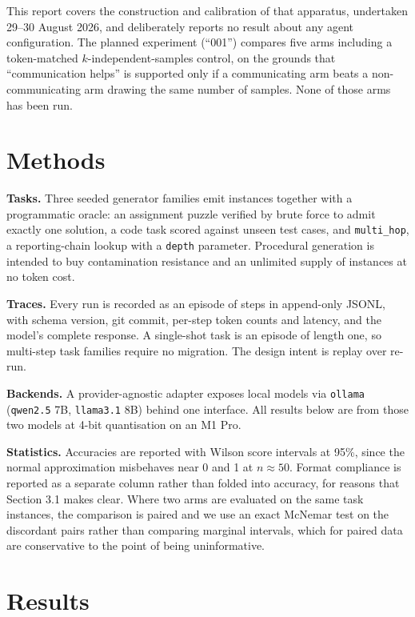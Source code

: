 \documentclass[10pt,twocolumn]{article}
\begin{document}
This report covers the construction and calibration of that apparatus, undertaken 29--30 August
2026, and deliberately reports no result about any agent configuration. The planned experiment
(``001'') compares five arms including a token-matched $k$-independent-samples control, on the
grounds that ``communication helps'' is supported only if a communicating arm beats a
non-communicating arm drawing the same number of samples. None of those arms has been run.

\section{Methods}

\textbf{Tasks.} Three seeded generator families emit instances together with a programmatic oracle:
an assignment puzzle verified by brute force to admit exactly one solution, a code task scored
against unseen test cases, and \texttt{multi\_hop}, a reporting-chain lookup with a
\texttt{depth} parameter. Procedural generation is intended to buy contamination resistance and an
unlimited supply of instances at no token cost.

\textbf{Traces.} Every run is recorded as an episode of steps in append-only JSONL, with schema
version, git commit, per-step token counts and latency, and the model's complete response. A
single-shot task is an episode of length one, so multi-step task families require no migration.
The design intent is replay over re-run.

\textbf{Backends.} A provider-agnostic adapter exposes local models via \texttt{ollama}
(\texttt{qwen2.5} 7B, \texttt{llama3.1} 8B) behind one interface. All results below are from those
two models at 4-bit quantisation on an M1 Pro.

\textbf{Statistics.} Accuracies are reported with Wilson score intervals at 95\%, since the normal
approximation misbehaves near 0 and 1 at $n \approx 50$. Format compliance is reported as a
separate column rather than folded into accuracy, for reasons that Section 3.1 makes clear. Where two arms
are evaluated on the same task instances, the comparison is paired and we use an exact McNemar test
on the discordant pairs rather than comparing marginal intervals, which for paired data are
conservative to the point of being uninformative.

\section{Results}
\end{document}
